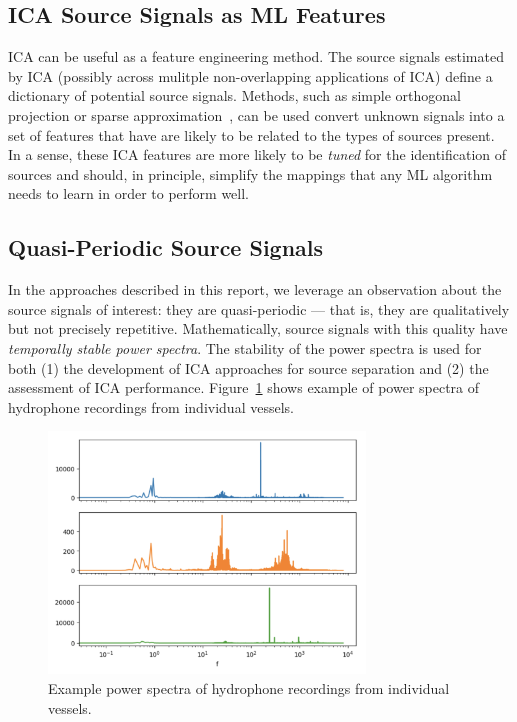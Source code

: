 \documentclass[10pt]{article}
\begin{document}
\subsection*{ICA Source Signals as ML Features}
ICA can be useful as a feature engineering method. The source signals estimated by ICA
(possibly across mulitple non-overlapping applications of ICA) define a dictionary of
potential source signals. Methods, such as simple orthogonal projection or sparse
approximation~\cite{blumensath:2009,needell:2009,wikipedia-sparse-approximation}, can be
used convert unknown signals into a set of features that have are likely to be related to
the types of sources present. In a sense, these ICA features are more likely to be
\emph{tuned} for the identification of sources and should, in principle, simplify the
mappings that any ML algorithm needs to learn in order to perform well.

\subsection*{Quasi-Periodic Source Signals}
In the approaches described in this report, we leverage an observation about the source
signals of interest: they are quasi-periodic --- that is, they are qualitatively but not
precisely repetitive. Mathematically, source signals with this quality have
\emph{temporally stable power spectra}. The stability of the power spectra is used for both
(1) the development of ICA approaches for source separation and (2) the assessment of ICA
performance. Figure~\ref{fig:power-spectra-examples} shows example of power spectra of
hydrophone recordings from individual vessels.

\begin{figure}[ht]
    \centering
    \includegraphics[width=0.75\textwidth]{power-spectra-examples}
    \caption{\label{fig:power-spectra-examples}
        Example power spectra of hydrophone recordings from individual vessels.
    }
\end{figure}
\end{document}
